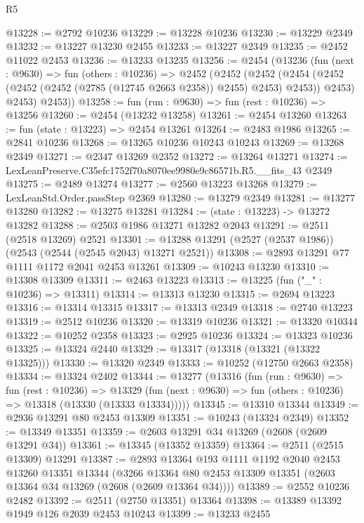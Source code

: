 \begin{lexlean}{R5}
\begin{coremodule}
@13228 := @2792 @10236
@13229 := @13228 @10236
@13230 := @13229 @2349
@13232 := @13227 @13230 @2455
@13233 := @13227 @2349
@13235 := @2452 @11022 @2453
@13236 := @13233 @13235
@13256 := @2454
    (@13236
      (fun (next : @9630) =>
      fun (others : @10236) =>
      @2452
        (@2452
          (@2452
            (@2454 (@2452 (@2452 (@2452 (@2785 (@12745 @2663 @2358)) @2455) @2453) @2453))
            @2453)
          @2453)
        @2453))
@13258 := fun (run : @9630) => fun (rest : @10236) => @13256
@13260 := @2454 (@13232 @13258)
@13261 := @2454 @13260
@13263 := fun (state : @13223) => @2454 @13261
@13264 := @2483 @1986
@13265 := @2841 @10236
@13268 := @13265 @10236 @10243 @10243
@13269 := @13268 @2349
@13271 := @2347 @13269 @2352
@13272 := @13264 @13271
@13274 := LexLeanPreserve.C35efc1752f70a8070ee9980e9c86571b.R5.__fits_43 @2349
@13275 := @2489 @13274
@13277 := @2560 @13223 @13268
@13279 := LexLeanStd.Order.passStep @2369
@13280 := @13279 @2349
@13281 := @13277 @13280
@13282 := @13275 @13281
@13284 := (state : @13223) -> @13272 @13282
@13288 := @2503 @1986 @13271 @13282 @2043
@13291 := @2511 (@2518 @13269) @2521
@13301 := @13288 @13291 (@2527 (@2537 @1986)) (@2543 (@2544 (@2545 @2043) @13271 @2521))
@13308 := @2893 @13291 @77 @1111 @1172 @2041 @2453 @13261
@13309 := @10243 @13230
@13310 := @13308 @13309
@13311 := @2463 @13223
@13313 := @13225 (fun ("_" : @10236) => @13311)
@13314 := @13313 @13230
@13315 := @2694 @13223
@13316 := @13314 @13315
@13317 := @13313 @2349
@13318 := @2740 @13223
@13319 := @2512 @10236
@13320 := @13319 @10236
@13321 := @13320 @10344
@13322 := @10252 @2358
@13323 := @2925 @10236
@13324 := @13323 @10236
@13325 := @13324 @2440
@13329 := @13317 (@13318 (@13321 (@13322 @13325)))
@13330 := @13320 @2349
@13333 := @10252 (@12750 @2663 @2358)
@13334 := @13324 @2402
@13344 := @13277
    (@13316
      (fun (run : @9630) =>
      fun (rest : @10236) =>
      @13329 (fun (next : @9630) => fun (others : @10236) => @13318 (@13330 (@13333 @13334)))))
@13345 := @13310 @13344
@13349 := @2936 @13291 @80 @2453 @13309
@13351 := @10243 (@13324 @2349)
@13352 := @13349 @13351
@13359 := @2603 @13291 @34 @13269 (@2608 (@2609 @13291 @34))
@13361 := @13345 (@13352 @13359)
@13364 := @2511 (@2515 @13309) @13291
@13387 := @2893
    @13364
    @193
    @1111
    @1192
    @2040
    @2453
    @13260
    @13351
    @13344
    (@3266 @13364 @80 @2453 @13309 @13351 (@2603 @13364 @34 @13269 (@2608 (@2609 @13364 @34))))
@13389 := @2552 @10236 @2482
@13392 := @2511 (@2750 @13351) @13364
@13398 := @13389 @13392 @1949 @126 @2039 @2453 @10243
@13399 := @13233 @2455

\end{coremodule}
\end{lexlean}
